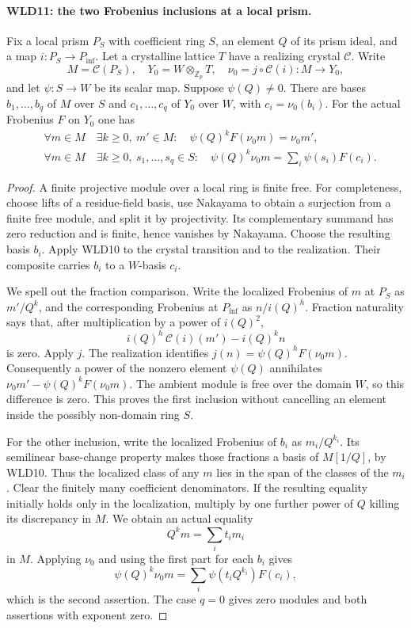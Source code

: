 \documentclass[11pt,a4paper]{article}
\numberwithin{equation}{section}
\theoremstyle{remark}\newtheorem{remark}[theorem]{Remark}
\begin{document}
\paragraph{WLD11: the two Frobenius inclusions at a local prism.}
\label{claim:WLD11}
Fix a local prism $P_S$ with coefficient ring $S$, an element
$Q$ of its prism ideal, and a map $i:P_S\to P_{\inf}$.
Let a crystalline lattice $T$ have a realizing crystal $\mathcal C$.
Write
\[
 M=\mathcal C(P_S),\quad
 Y_0=W\otimes_{\mathbb Z_p}T,\quad
 \nu_0=j\circ\mathcal C(i):M\longrightarrow Y_0,
\]
and let $\psi:S\to W$ be its scalar map. Suppose $\psi(Q)\ne0$.
There are bases $b_1,\ldots,b_q$ of $M$ over $S$ and
$c_1,\ldots,c_q$ of $Y_0$ over $W$, with $c_i=\nu_0(b_i)$.
For the actual Frobenius $F$ on $Y_0$ one has
\[
 \begin{split}
 &\forall m\in M\quad
   \exists k\ge0,\ m'\in M:\quad
           \psi(Q)^kF(\nu_0m)=\nu_0m',\\
 &\forall m\in M\quad
   \exists k\ge0,\ s_1,\ldots,s_q\in S:\quad
           \psi(Q)^k\nu_0m=\sum_i\psi(s_i)F(c_i).
 \end{split}                                                \tag{WLD.13}
\]

\begin{proof}
A finite projective module over a local ring is finite free.
For completeness, choose lifts of a residue-field basis, use
Nakayama to obtain a surjection from a finite free module, and split
it by projectivity. Its complementary summand has zero reduction
and is finite, hence vanishes by Nakayama. Choose the resulting
basis $b_i$. Apply WLD10 to the crystal transition and to the
realization. Their composite carries $b_i$ to a $W$-basis $c_i$.

We spell out the fraction comparison. Write the localized Frobenius
of $m$ at $P_S$ as $m'/Q^k$, and the corresponding Frobenius at
$P_{\inf}$ as $n/i(Q)^h$. Fraction naturality says that, after
multiplication by a power of $i(Q)^2$,
\[
               i(Q)^h\,\mathcal C(i)(m')
                       -i(Q)^k n
\]
is zero. Apply $j$. The realization identifies
$j(n)=\psi(Q)^hF(\nu_0m)$. Consequently a power of the nonzero
element $\psi(Q)$ annihilates
$\nu_0m'-\psi(Q)^kF(\nu_0m)$. The ambient module is free over the
domain $W$, so this difference is zero. This proves the first
inclusion without cancelling an element inside the possibly
non-domain ring $S$.

For the other inclusion, write the localized Frobenius of $b_i$
as $m_i/Q^{k_i}$. Its semilinear base-change property makes those
fractions a basis of $M[1/Q]$, by WLD10. Thus the localized class
of any $m$ lies in the span of the classes of the $m_i$.
Clear the finitely many coefficient denominators. If the resulting
equality initially holds only in the localization, multiply by
one further power of $Q$ killing its discrepancy in $M$.
We obtain an actual equality
\[
                         Q^k m=\sum_i t_i m_i
\]
in $M$. Applying $\nu_0$ and using the first part for each $b_i$
gives
\[
 \psi(Q)^k\nu_0m
       =\sum_i\psi(t_iQ^{k_i})F(c_i),
\]
which is the second assertion. The case $q=0$ gives zero modules
and both assertions with exponent zero.
\end{proof}
\end{document}
